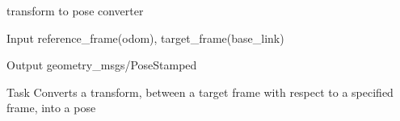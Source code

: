 \begin{frame}{transform to pose converter}
	\begin{alertblock}{Input}
	reference\_frame(odom), target\_frame(base\_link)
    \end{alertblock}
    
    \begin{alertblock}{Output}
	geometry\_msgs/PoseStamped
    \end{alertblock}
    
    \begin{alertblock}{Task}
    Converts a transform, between a target frame with respect to a specified frame, into a pose
    \end{alertblock}
\end{frame}

